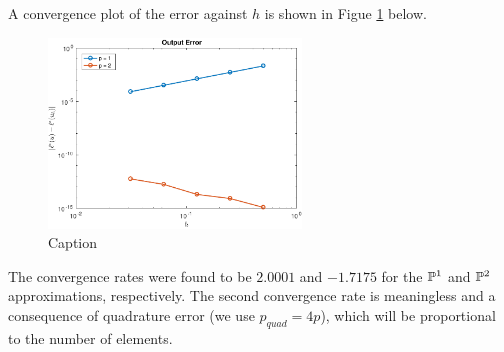 \documentclass{article}
\begin{document}
\begin{itemize}
	A convergence plot of the error against \(h\) is shown in Figue \ref{fig:mms_out} below.
	\begin{figure}[H]
		\centering
		\includegraphics[width=0.6\textwidth]{MMS_output_conv.pdf}
		\caption{Caption}
		\label{fig:mms_out}
	\end{figure}
	The convergence rates were found to be \(2.0001\) and \(-1.7175\) for the \(\mathbb{P}^1 \) and \(\mathbb{P}^2 \) approximations, respectively. The second convergence rate is meaningless and a consequence of quadrature error (we use \(p_{quad} = 4p\)), which will be proportional to the number of elements. 
\end{itemize}
\end{document}
